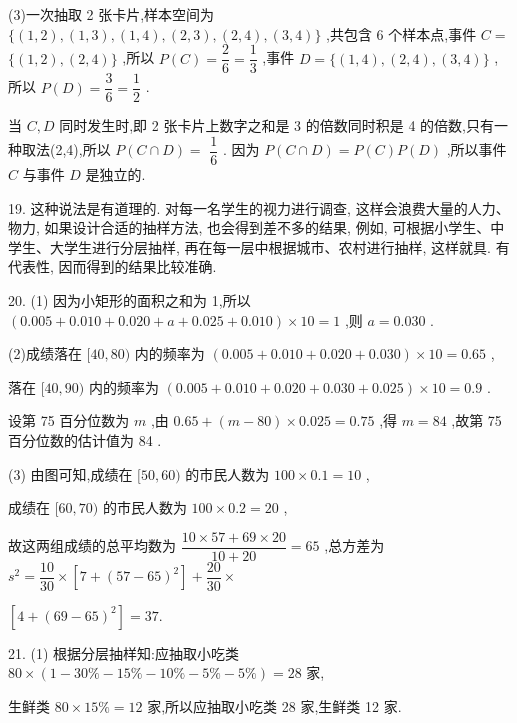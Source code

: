 (3)一次抽取 2 张卡片,样本空间为 $\{ \left( {1,2}\right) ,\left( {1,3}\right) ,\left( {1,4}\right) ,\left( {2,3}\right) ,\left( {2,4}\right) ,\left( {3,4}\right) \}$ ,共包含 6 个样本点,事件 $C =$  $\{ \left( {1,2}\right) ,\left( {2,4}\right) \}$ ,所以 $P\left( C\right)  = \dfrac{2}{6} = \dfrac{1}{3}$ ,事件 $D = \{ \left( {1,4}\right) ,\left( {2,4}\right) ,\left( {3,4}\right) \}$ ,所以 $P\left( D\right)  = \dfrac{3}{6} = \dfrac{1}{2}$ .

当 $C,D$ 同时发生时,即 2 张卡片上数字之和是 3 的倍数同时积是 4 的倍数,只有一种取法(2,4),所以 $P\left( {C \cap  D}\right)  =$  $\dfrac{1}{6}$ . 因为 $P\left( {C \cap  D}\right)  = P\left( C\right) P\left( D\right)$ ,所以事件 $C$ 与事件 $D$ 是独立的.

19. 这种说法是有道理的. 对每一名学生的视力进行调查, 这样会浪费大量的人力、物力, 如果设计合适的抽样方法, 也会得到差不多的结果, 例如, 可根据小学生、中学生、大学生进行分层抽样, 再在每一层中根据城市、农村进行抽样, 这样就具. 有代表性, 因而得到的结果比较准确.

20. (1) 因为小矩形的面积之和为 1,所以 $\left( {{0.005} + {0.010} + {0.020} + a + {0.025} + {0.010}}\right)  \times  {10} = 1$ ,则 $a = {0.030}$ .

(2)成绩落在 $\lbrack {40},{80})$ 内的频率为 $\left( {{0.005} + {0.010} + {0.020} + {0.030}}\right)  \times  {10} = {0.65}$ ,

落在 $\lbrack {40},{90})$ 内的频率为 $\left( {{0.005} + {0.010} + {0.020} + {0.030} + {0.025}}\right)  \times  {10} = {0.9}$ .

设第 75 百分位数为 $m$ ,由 ${0.65} + \left( {m - {80}}\right)  \times  {0.025} = {0.75}$ ,得 $m = {84}$ ,故第 75 百分位数的估计值为 84 .

(3) 由图可知,成绩在 $\lbrack {50},{60})$ 的市民人数为 ${100} \times  {0.1} = {10}$ ,

成绩在 $\lbrack {60},{70})$ 的市民人数为 ${100} \times  {0.2} = {20}$ ,

故这两组成绩的总平均数为 $\dfrac{{10} \times  {57} + {69} \times  {20}}{{10} + {20}} = {65}$ ,总方差为 ${s}^{2} = \dfrac{10}{30} \times  \left\lbrack  {7 + {\left( {57} - {65}\right) }^{2}}\right\rbrack   + \dfrac{20}{30} \times$

$\left\lbrack  {4 + {\left( {69} - {65}\right) }^{2}}\right\rbrack   = {37}.$

21. (1) 根据分层抽样知:应抽取小吃类 ${80} \times  \left( {1 - {30}\%  - {15}\%  - {10}\%  - 5\%  - 5\% }\right)  = {28}$ 家,

生鲜类 ${80} \times  {15}\%  = {12}$ 家,所以应抽取小吃类 28 家,生鲜类 12 家.

